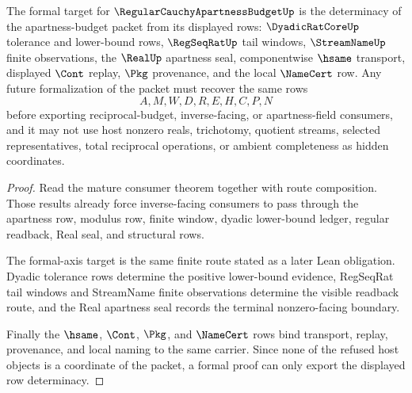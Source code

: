 \begin{theorem}
\label{thm:regular-cauchy-apartness-budget-formal-axis-target}
The formal target for $\RegularCauchyApartnessBudgetUp$ is the determinacy of the apartness-budget packet from its displayed rows: $\DyadicRatCoreUp$ tolerance and lower-bound rows, $\RegSeqRatUp$ tail windows, $\StreamNameUp$ finite observations, the $\RealUp$ apartness seal, componentwise $\hsame$ transport, displayed $\Cont$ replay, $\Pkg$ provenance, and the local $\NameCert$ row. Any future formalization of the packet must recover the same rows
$$
A,M,W,D,R,E,H,C,P,N
$$
before exporting reciprocal-budget, inverse-facing, or apartness-field consumers, and it may not use host nonzero reals, trichotomy, quotient streams, selected representatives, total reciprocal operations, or ambient completeness as hidden coordinates.
\end{theorem}
\begin{proof}
Read the mature consumer theorem together with route composition. Those results already force inverse-facing consumers to pass through the apartness row, modulus row, finite window, dyadic lower-bound ledger, regular readback, Real seal, and structural rows.

The formal-axis target is the same finite route stated as a later Lean obligation. Dyadic tolerance rows determine the positive lower-bound evidence, RegSeqRat tail windows and StreamName finite observations determine the visible readback route, and the Real apartness seal records the terminal nonzero-facing boundary.

Finally the $\hsame$, $\Cont$, $\Pkg$, and $\NameCert$ rows bind transport, replay, provenance, and local naming to the same carrier. Since none of the refused host objects is a coordinate of the packet, a formal proof can only export the displayed row determinacy.
\end{proof}



